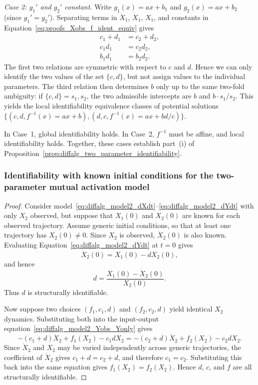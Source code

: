 \documentclass{article}
\theoremstyle{plain}
\theoremstyle{definition}
\begin{document}
{\medskip\noindent
\textit{Case 2: $g_1'$ and $g_2'$ constant.} Write $g_1(x) = ax + b_1$ and $g_2(x) = ax + b_2$ (since $g_1' = g_2'$). Separating terms in $\ddot{X}_1$, $\dot{X}_1$, $X_1$, and constants in Equation~\eqref{eq:proofs_Xobs_f_ident_equiv} gives
\begin{align*}
    c_1 + d_1 &= c_2 + d_2, \\
    c_1 d_1   &= c_2 d_2, \\
    b_1 d_1   &= b_2 d_2.
\end{align*}
The first two relations are symmetric with respect to $c$ and $d$. Hence we can only identify the two values of the set $\{c,d\}$, but not assign values to the individual parameters. The third relation then determines $b$ only up to the same two-fold ambiguity: if $\{c, d\} = {s_1, s_2}$, the two admissible intercepts are $b$ and $b\cdot s_1/s_2$. This yields the local identifiability equivalence classes of potential solutions $\{(c, d, f^{-1}(x) = ax + b) , (d, c, f^{-1}(x) = ax + bd/c)\}$.

\medskip\noindent
In Case~1, global identifiability holds. In Case~2, $f^{-1}$ must be affine, and local identifiability holds. Together, these cases establish part~(i) of Proposition~\ref{prop:diffalg_two_parameter_identifiability}.

\subsubsection{Identifiability with known initial conditions for the two-parameter mutual activation model} \label{appendix:proof_case4_known_initial_conditions}

\begin{proof}
Consider model~\eqref{eq:diffalg_model2_dXdt}--\eqref{eq:diffalg_model2_dYdt} with only $X_2$ observed, but suppose that $X_1(0)$ and $X_2(0)$ are known for each observed trajectory. Assume generic initial conditions, so that at least one trajectory has $X_2(0)\neq 0$. Since $X_2$ is observed, $\dot{X}_2(0)$ is also known. Evaluating Equation~\eqref{eq:diffalg_model2_dYdt} at $t=0$ gives
\begin{equation*}
    \dot{X}_2(0)=X_1(0)-dX_2(0),
\end{equation*}
and hence
\begin{equation*}
    d=\frac{X_1(0)-\dot{X}_2(0)}{X_2(0)}.
\end{equation*}
Thus $d$ is structurally identifiable.

Now suppose two choices $(f_1,c_1,d)$ and $(f_2,c_2,d)$ yield identical $X_2$ dynamics. Substituting both into the input-output equation~\eqref{eq:diffalg_model2_Yobs_Yonly} gives
\begin{equation*}
    -(c_1+d)\dot{X}_2 + f_1(X_2)-c_1dX_2
    =
    -(c_2+d)\dot{X}_2 + f_2(X_2)-c_2dX_2.
\end{equation*}
Since $\dot{X}_2$ and $X_2$ may be varied independently across generic trajectories, the coefficient of $\dot{X}_2$ gives $c_1+d=c_2+d$, and therefore $c_1=c_2$. Substituting this back into the same equation gives $f_1(X_2)=f_2(X_2)$. Hence $d$, $c$, and $f$ are all structurally identifiable.
\end{proof}

}
\end{document}
